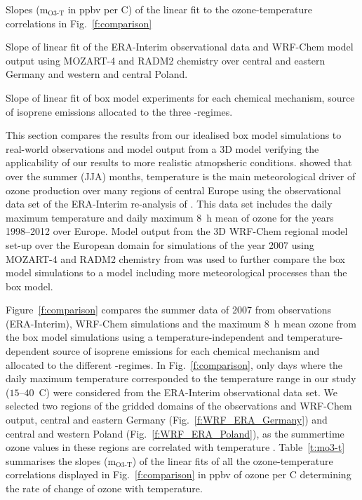 \begin{table}[t]%
    \centering%
    \caption{Slopes (m$_{\text{O3-T}}$ in ppbv per \degree C) of the linear fit to the ozone-temperature correlations in Fig.~\ref{f:comparison}}%
    \label{t:mo3-t}%
    \begin{subtable}[t]{\textwidth}%
        \centering%
        \vspace{2mm}%
        \caption{Slope of linear fit of the ERA-Interim observational data and WRF-Chem model output using MOZART-4 and RADM2 chemistry over central and eastern Germany and western and central Poland.}%
        \label{t:era_wrf_o3-T}%
    \end{subtable}
    \begin{subtable}[t]{\textwidth}%
        \centering%
        \vspace{2mm}
        \caption{Slope of linear fit of box model experiments for each chemical mechanism, source of isoprene emissions allocated to the three -regimes.}%
        \label{t:boxmodel_o3-T}%
    \end{subtable}
\end{table} 

This section compares the results from our idealised box model simulations to real-world observations and model output from a 3D model verifying the applicability of our results to more realistic atmopsheric conditions.
\citet{Otero:2016} showed that over the summer (JJA) months, temperature is the main meteorological driver of ozone production over many regions of central Europe using the observational data set of the ERA-Interim re-analysis of \citet{Schnell:2015}.
This data set includes the daily maximum temperature and daily maximum 8~h mean of ozone for the years 1998--2012 over Europe.
Model output from the 3D WRF-Chem regional model set-up over the European domain for simulations of the year 2007 using MOZART-4 and RADM2 chemistry from \citet{Mar:2015} was used to further compare the box model simulations to a model including more meteorological processes than the box model.

Figure~\ref{f:comparison} compares the summer data of 2007 from observations (ERA-Interim), WRF-Chem simulations and the maximum 8~h mean ozone from the box model simulations using a temperature-independent and temperature-dependent source of isoprene emissions for each chemical mechanism and allocated to the different -regimes.
In Fig.~\ref{f:comparison}, only days where the daily maximum temperature corresponded to the temperature range in our study ($15$--$40$~\degree C) were considered from the ERA-Interim observational data set.
We selected two regions of the gridded domains of the observations and WRF-Chem output, central and eastern Germany (Fig.~\ref{f:WRF_ERA_Germany}) and central and western Poland (Fig.~\ref{f:WRF_ERA_Poland}), as the summertime ozone values in these regions are correlated with temperature \citep{Otero:2016}.
Table~\ref{t:mo3-t} summarises the slopes (m$_{\text{O3-T}}$) of the linear fits of all the ozone-temperature correlations displayed in Fig.~\ref{f:comparison} in ppbv of ozone per \degree C determining the rate of change of ozone with temperature.

